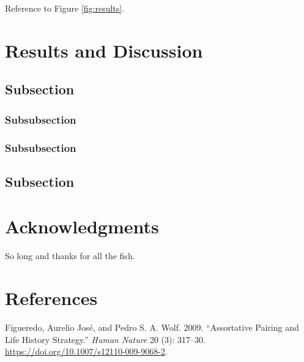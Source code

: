 \documentclass[fleqn,10pt,lineno]{wlpeerj} %
\newlength{\cslhangindent}
\newenvironment{cslreferences}%
  {\setlength{\parindent}{0pt}%
  \everypar{\setlength{\hangindent}{\cslhangindent}}\ignorespaces}%
  {\par}
\begin{document}
Reference to Figure \ref{fig:results}.

\hypertarget{results-and-discussion}{%
\section*{Results and Discussion}\label{results-and-discussion}}

\lipsum[10]

\hypertarget{subsection-2}{%
\subsection*{Subsection}\label{subsection-2}}

\lipsum[11]

\hypertarget{subsubsection}{%
\subsubsection*{Subsubsection}\label{subsubsection}}

\lipsum[12]

\hypertarget{subsubsection-1}{%
\subsubsection*{Subsubsection}\label{subsubsection-1}}

\lipsum[14]

\hypertarget{subsection-3}{%
\subsection*{Subsection}\label{subsection-3}}

\lipsum[15-20]

\hypertarget{acknowledgments}{%
\section*{Acknowledgments}\label{acknowledgments}}

So long and thanks for all the fish.

\hypertarget{references}{%
\section*{References}\label{references}}

\hypertarget{refs}{}
\begin{cslreferences}
\leavevmode\hypertarget{ref-Figueredo:2009dg}{}%
Figueredo, Aurelio José, and Pedro S. A. Wolf. 2009. ``Assortative Pairing and Life History Strategy.'' \emph{Human Nature} 20 (3): 317--30. \url{https://doi.org/10.1007/s12110-009-9068-2}.
\end{cslreferences}
\end{document}
